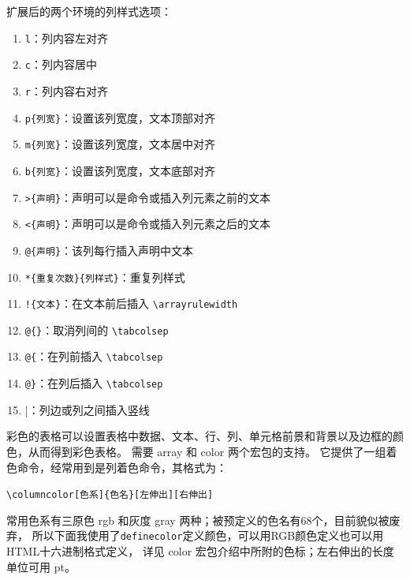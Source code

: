 扩展后的两个环境的列样式选项：

\begin{enumerate}[label=(\arabic*)]
    \item \verb|l|：列内容左对齐
    \item \verb|c|：列内容居中
    \item \verb|r|：列内容右对齐
    \item \verb|p{列宽}|：设置该列宽度，文本顶部对齐
    \item \verb|m{列宽}|：设置该列宽度，文本居中对齐
    \item \verb|b{列宽}|：设置该列宽度，文本底部对齐
    \item \verb|>{声明}|：声明可以是命令或插入列元素之前的文本
    \item \verb|<{声明}|：声明可以是命令或插入列元素之后的文本
    \item \verb|@{声明}|：该列每行插入声明中文本
    \item \verb|*{重复次数}{列样式}|：重复列样式
    \item \verb|!{文本}|：在文本前后插入 \verb|\arrayrulewidth|
    \item \verb|@{}|：取消列间的 \verb|\tabcolsep|
    \item \verb|@{|：在列前插入 \verb|\tabcolsep|
    \item \verb|@}|：在列后插入 \verb|\tabcolsep|
    \item \verb|||：列边或列之间插入竖线
\end{enumerate}

彩色的表格可以设置表格中数据、文本、行、列、单元格前景和背景以及边框的颜色，从而得到彩色表格。
需要 array 和 color 两个宏包的支持。 
它提供了一组着色命令，经常用到是列着色命令，其格式为：

\verb|\columncolor[色系]{色名}[左伸出][右伸出]|

常用色系有三原色 rgb 和灰度 gray 两种；被预定义的色名有68个，目前貌似被废弃，
所以下面我使用了\verb|definecolor|定义颜色，可以用RGB颜色定义也可以用HTML十六进制格式定义，
详见 color 宏包介绍中所附的色标；左右伸出的长度单位可用 pt。

